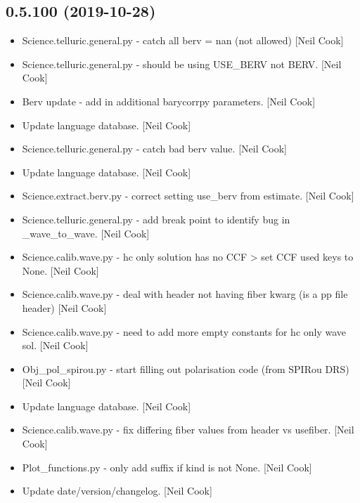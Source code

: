 \documentclass[a4paper,10pt,english]{report}
\begin{document}
\subsection{0.5.100 (2019-10-28)}
\label{\detokenize{misc/changelog:id41}}\begin{itemize}
\item {} 
Science.telluric.general.py - catch all berv = nan (not allowed) {[}Neil
Cook{]}

\item {} 
Science.telluric.general.py - should be using USE\_BERV not BERV. {[}Neil
Cook{]}

\item {} 
Berv update - add in additional barycorrpy parameters. {[}Neil Cook{]}

\item {} 
Update language database. {[}Neil Cook{]}

\item {} 
Science.telluric.general.py - catch bad berv value. {[}Neil Cook{]}

\item {} 
Update language database. {[}Neil Cook{]}

\item {} 
Science.extract.berv.py - correct setting use\_berv from estimate.
{[}Neil Cook{]}

\item {} 
Science.telluric.general.py - add break point to identify bug in
\_wave\_to\_wave. {[}Neil Cook{]}

\item {} 
Science.calib.wave.py - hc only solution has no CCF \textendash{}\textgreater{} set CCF used
keys to None. {[}Neil Cook{]}

\item {} 
Science.calib.wave.py - deal with header not having fiber kwarg (is a
pp file header) {[}Neil Cook{]}

\item {} 
Science.calib.wave.py - need to add more empty constants for hc only
wave sol. {[}Neil Cook{]}

\item {} 
Obj\_pol\_spirou.py - start filling out polarisation code (from SPIRou
DRS) {[}Neil Cook{]}

\item {} 
Update language database. {[}Neil Cook{]}

\item {} 
Science.calib.wave.py - fix differing fiber values from header vs
usefiber. {[}Neil Cook{]}

\item {} 
Plot\_functions.py - only add suffix if kind is not None. {[}Neil Cook{]}

\item {} 
Update date/version/changelog. {[}Neil Cook{]}

\end{itemize}
\end{document}

